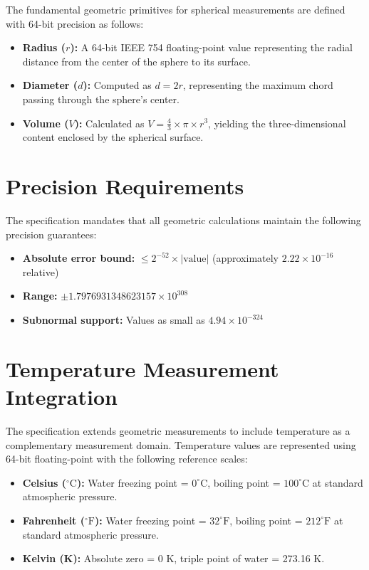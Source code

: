 \documentclass[12pt]{book}
\begin{document}
The fundamental geometric primitives for spherical measurements are defined with 64-bit precision as follows:

\begin{itemize}
\item \textbf{Radius ($r$):} A 64-bit IEEE 754 floating-point value representing the radial distance from the center of the sphere to its surface.
\item \textbf{Diameter ($d$):} Computed as $d = 2r$, representing the maximum chord passing through the sphere's center.
\item \textbf{Volume ($V$):} Calculated as $V = \frac{4}{3} \times \pi \times r^3$, yielding the three-dimensional content enclosed by the spherical surface.
\end{itemize}

\section{Precision Requirements}

The specification mandates that all geometric calculations maintain the following precision guarantees:

\begin{itemize}
\item \textbf{Absolute error bound:} $\leq 2^{-52} \times |\text{value}|$ (approximately $2.22 \times 10^{-16}$ relative)
\item \textbf{Range:} $\pm 1.7976931348623157 \times 10^{308}$
\item \textbf{Subnormal support:} Values as small as $4.94 \times 10^{-324}$
\end{itemize}

\section{Temperature Measurement Integration}

The specification extends geometric measurements to include temperature as a complementary measurement domain. Temperature values are represented using 64-bit floating-point with the following reference scales:

\begin{itemize}
\item \textbf{Celsius ($^{\circ}\text{C}$):} Water freezing point = $0^{\circ}\text{C}$, boiling point = $100^{\circ}\text{C}$ at standard atmospheric pressure.
\item \textbf{Fahrenheit ($^{\circ}\text{F}$):} Water freezing point = $32^{\circ}\text{F}$, boiling point = $212^{\circ}\text{F}$ at standard atmospheric pressure.
\item \textbf{Kelvin (K):} Absolute zero = 0 K, triple point of water = 273.16 K.
\end{itemize}
\end{document}
